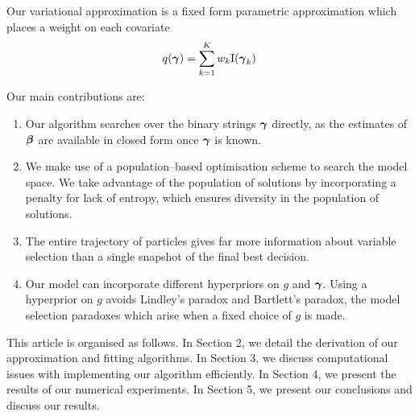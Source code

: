 Our variational approximation is a fixed form parametric approximation which places a weight on each covariate
\[
	q({\boldsymbol \gamma}) = \sum_{k=1}^K w_k \text{I}({\boldsymbol \gamma}_k)
\]


Our main contributions are:

\begin{enumerate}
	\item Our algorithm searches over the binary strings ${\boldsymbol \gamma}$ directly, as the estimates of ${\boldsymbol \beta}$ are available 
	in closed form once ${\boldsymbol \gamma}$ is known.

	\item We make use of a population--based optimisation scheme to search the model space. We take advantage of the
	population of solutions by incorporating a penalty for lack of entropy, which ensures diversity in the
	population of solutions.

	\item The entire trajectory of particles gives far more information about variable selection than a single
	snapshot of the final best decision.

	\item Our model can incorporate different hyperpriors on $g$ and ${\boldsymbol \gamma}$. Using a hyperprior on $g$
				avoids Lindley's paradox and Bartlett's paradox, the model selection paradoxes which arise when a
				fixed choice of $g$ is made.
\end{enumerate}

This article is organised as follows. In Section 2, we detail the derivation of our approximation and fitting
algorithms. In Section 3, we discuss computational issues with implementing our algorithm efficiently. In
Section 4, we present the results of our numerical experiments. In Section 5, we present our conclusions and
discuss our results.




